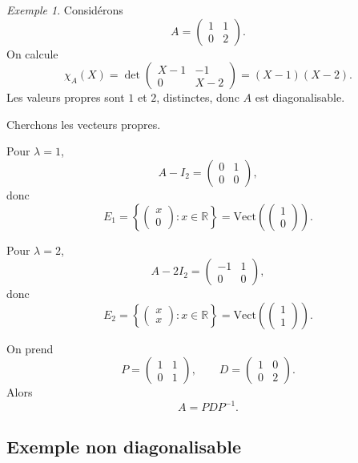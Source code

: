\documentclass[11pt,a4paper]{article}
\theoremstyle{remark}
\newtheorem{exemple}[definition]{Exemple}
\newcommand{\R}{\mathbb{R}}
\newcommand{\Vect}{\mathrm{Vect}}
\begin{document}
\begin{exemple}
Considérons
\[
A=
\begin{pmatrix}
1 & 1\\
0 & 2
\end{pmatrix}.
\]
On calcule
\[
\chi_A(X)=\det\begin{pmatrix}
X-1 & -1\\
0 & X-2
\end{pmatrix}
=(X-1)(X-2).
\]
Les valeurs propres sont \(1\) et \(2\), distinctes, donc \(A\) est diagonalisable.

Cherchons les vecteurs propres.

Pour \(\lambda=1\),
\[
A-I_2=
\begin{pmatrix}
0 & 1\\
0 & 0
\end{pmatrix},
\]
donc
\[
E_1=\left\{
\begin{pmatrix}
x\\0
\end{pmatrix}
: x\in\R
\right\}
=
\Vect\left(
\begin{pmatrix}
1\\0
\end{pmatrix}
\right).
\]

Pour \(\lambda=2\),
\[
A-2I_2=
\begin{pmatrix}
-1 & 1\\
0 & 0
\end{pmatrix},
\]
donc
\[
E_2=\left\{
\begin{pmatrix}
x\\x
\end{pmatrix}
: x\in\R
\right\}
=
\Vect\left(
\begin{pmatrix}
1\\1
\end{pmatrix}
\right).
\]

On prend
\[
P=
\begin{pmatrix}
1 & 1\\
0 & 1
\end{pmatrix},
\qquad
D=
\begin{pmatrix}
1 & 0\\
0 & 2
\end{pmatrix}.
\]
Alors
\[
A=PDP^{-1}.
\]
\end{exemple}

\subsection{Exemple non diagonalisable}
\end{document}
